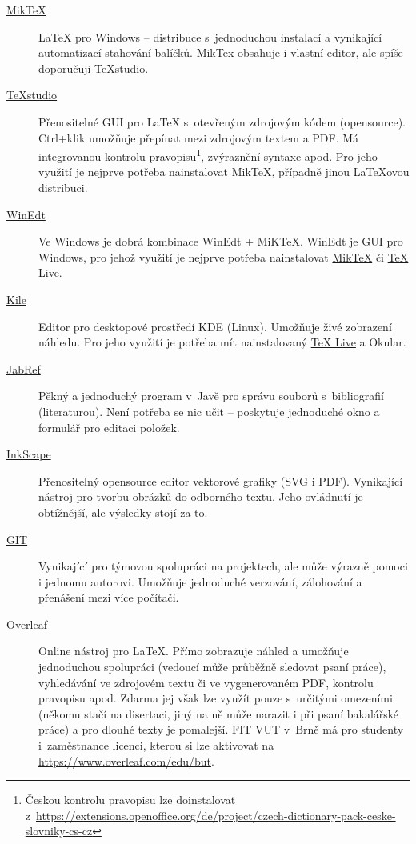 \begin{description}
	\item[\href{http://miktex.org/download}{MikTeX}] \LaTeX{} pro Windows -- distribuce s~jednoduchou instalací a vynikající automatizací stahování balíčků. MikTex obsahuje i vlastní editor, ale spíše doporučuji TeXstudio.
	\item[\href{http://texstudio.sourceforge.net/}{TeXstudio}] Přenositelné GUI pro \LaTeX{} s~otevřeným zdrojovým kódem (opensource).  Ctrl+klik umožňuje přepínat mezi zdrojovým textem a PDF. Má integrovanou kontrolu pravopisu\footnote{Českou kontrolu pravopisu lze doinstalovat z~\url{https://extensions.openoffice.org/de/project/czech-dictionary-pack-ceske-slovniky-cs-cz}}, zvýraznění syntaxe apod. Pro jeho využití je nejprve potřeba nainstalovat MikTeX, případně jinou \LaTeX ovou distribuci.
	\item[\href{http://www.winedt.com/}{WinEdt}] Ve Windows je dobrá kombinace WinEdt + MiKTeX. WinEdt je GUI pro Windows, pro jehož využití je nejprve potřeba nainstalovat \href{http://miktex.org/download}{MikTeX} či \href{http://www.tug.org/texlive/}{TeX Live}. 
	\item[\href{http://kile.sourceforge.net/}{Kile}] Editor pro desktopové prostředí KDE (Linux). Umožňuje živé zobrazení náhledu. Pro jeho využití je potřeba mít nainstalovaný \href{http://www.tug.org/texlive/}{TeX Live} a Okular. 
	\item[\href{http://jabref.sourceforge.net/download.php}{JabRef}] Pěkný a jednoduchý program v~Javě pro správu souborů s~bibliografií (literaturou). Není potřeba se nic učit -- poskytuje jednoduché okno a formulář pro editaci položek.
	\item[\href{https://inkscape.org/en/download/}{InkScape}] Přenositelný opensource editor vektorové grafiky (SVG i PDF). Vynikající nástroj pro tvorbu obrázků do odborného textu. Jeho ovládnutí je obtížnější, ale výsledky stojí za to.
	\item[\href{https://git-scm.com/}{GIT}] Vynikající pro týmovou spolupráci na projektech, ale může výrazně pomoci i jednomu autorovi. Umožňuje jednoduché verzování, zálohování a přenášení mezi více počítači.
	\item[\href{http://www.overleaf.com/}{Overleaf}] Online nástroj pro \LaTeX{}. Přímo zobrazuje náhled a umožňuje jednoduchou spolupráci (vedoucí může průběžně sledovat psaní práce), vyhledávání ve zdrojovém textu či ve vygenerovaném PDF, kontrolu pravopisu apod. Zdarma jej však lze využít pouze s~určitými omezeními (někomu stačí na disertaci, jiný na ně může narazit i při psaní bakalářské práce) a pro dlouhé texty je pomalejší. FIT VUT v~Brně má pro studenty i~zaměstnance licenci, kterou si lze aktivovat na \url{https://www.overleaf.com/edu/but}.
\end{description}

